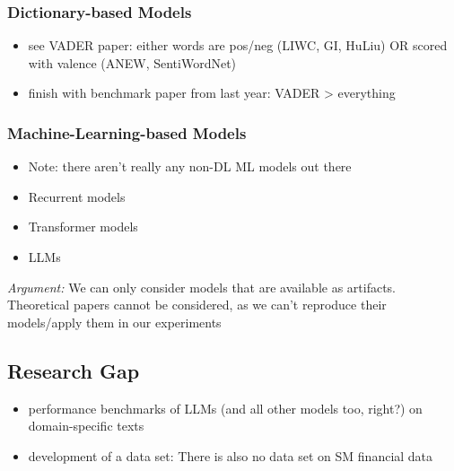 \subsubsection{Dictionary-based Models}
\begin{itemize}
	\item see VADER paper: either words are pos/neg (LIWC, GI, HuLiu) OR scored with valence (ANEW, SentiWordNet)
	\item finish with benchmark paper from last year: VADER > everything
\end{itemize}

\subsubsection{Machine-Learning-based Models}
\begin{itemize}[noitemsep]
	\item Note: there aren't really any non-DL ML models out there
	\item Recurrent models
	\item Transformer models
	\item LLMs
\end{itemize}


\emph{Argument:} We can only consider models that are available as artifacts. Theoretical papers cannot be considered, as we can't reproduce their models/apply them in our experiments










\subsection{Research Gap}
\begin{itemize}[noitemsep]
	\item performance benchmarks of LLMs (and all other models too, right?) on domain-specific texts
	\item development of a data set: There is also no data set on SM financial data 	
\end{itemize}







